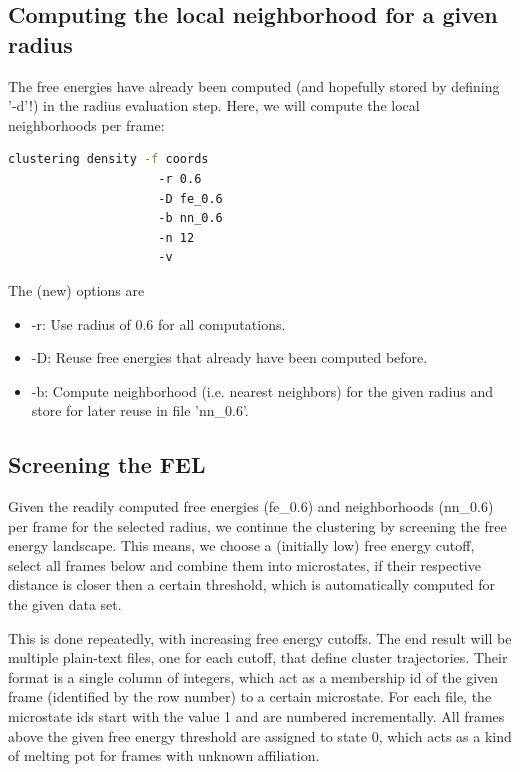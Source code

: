 \documentclass[12pt,a4paper,twoside,english,fleqn]{article}
\begin{document}
\subsection{Computing the local neighborhood for a given radius}
The free energies have already been computed (and hopefully stored by defining
'-d'!) in the radius evaluation step.
Here, we will compute the local neighborhoods per frame:
\begin{lstlisting}[language=bash,basicstyle=\ttfamily]
  clustering density -f coords
                     -r 0.6
                     -D fe_0.6
                     -b nn_0.6
                     -n 12
                     -v
\end{lstlisting}
The (new) options are
\begin{itemize}
  \item -r: Use radius of 0.6 for all computations.
  \item -D: Reuse free energies that already have been computed before.
  \item -b: Compute neighborhood (i.e. nearest neighbors) for the given
            radius and store for later reuse in file 'nn\_0.6'.
\end{itemize}

\subsection{Screening the FEL\label{sec:screening}}
Given the readily computed free energies (fe\_0.6) and neighborhoods (nn\_0.6)
per frame for the selected radius,
we continue the clustering by screening the free energy landscape.
This means, we choose a (initially low) free energy cutoff, select all frames
below and combine them into microstates, if their respective distance is closer
then a certain threshold, which is automatically computed for the given data
set.

This is done repeatedly, with increasing free energy cutoffs.
The end result will be multiple plain-text files, one for each cutoff, that
define cluster trajectories. Their format is a single column of integers, which
act as a membership id of the given frame (identified by the row number) to
a certain microstate.
For each file, the microstate ids start with the value 1 and are numbered
incrementally. All frames above the given free energy threshold are assigned to
state 0, which acts as a kind of melting pot for frames with unknown
affiliation.
\end{document}
